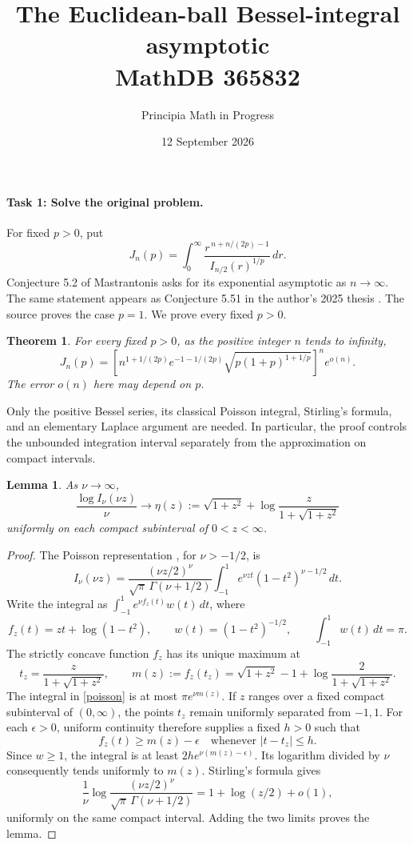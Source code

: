 \documentclass[11pt]{article}
\title{The Euclidean-ball Bessel-integral asymptotic\\MathDB 365832}
\author{Principia Math in Progress}
\date{12 September 2026}
\newtheorem{theorem}{Theorem}
\newtheorem{lemma}{Lemma}
\begin{document}
\maketitle

\paragraph{Task 1: Solve the original problem.}
For fixed \(p>0\), put
\[
 J_n(p)=\int_0^\infty
 \frac{r^{\,n+n/(2p)-1}}{I_{n/2}(r)^{1/p}}\,dr .
\]
Conjecture 5.2 of Mastrantonis \cite[p.~32]{M} asks for its
exponential asymptotic as \(n\to\infty\). The same statement appears as
Conjecture 5.51 in the author's 2025 thesis \cite[p.~214]{T}.
The source proves the case \(p=1\). We prove every fixed \(p>0\).

\begin{theorem}
For every fixed \(p>0\), as the positive integer \(n\) tends to infinity,
\[
 J_n(p)=
 \left[
 n^{1+1/(2p)}e^{-1-1/(2p)}
 \sqrt{p(1+p)^{1+1/p}}
 \right]^n e^{o(n)} .
\]
The error \(o(n)\) here may depend on \(p\).
\end{theorem}

Only the positive Bessel series, its classical Poisson integral,
Stirling's formula, and an elementary Laplace argument are needed.
In particular, the proof controls the unbounded integration interval
separately from the approximation on compact intervals.

\begin{lemma}\label{compact}
As \(\nu\to\infty\),
\[
 \frac{\log I_\nu(\nu z)}{\nu}\longrightarrow
 \eta(z):=\sqrt{1+z^2}+
 \log\frac{z}{1+\sqrt{1+z^2}}
\]
uniformly on each compact subinterval of \(0<z<\infty\).
\end{lemma}
\begin{proof}
The Poisson representation \cite[10.32.2]{DLMF}, for \(\nu>-1/2\), is
\begin{equation}\label{poisson}
 I_\nu(\nu z)=
 \frac{(\nu z/2)^\nu}{\sqrt{\pi}\,\Gamma(\nu+1/2)}
 \int_{-1}^{1}e^{\nu zt}(1-t^2)^{\nu-1/2}\,dt .
\end{equation}
Write the integral as
\(\int_{-1}^1 e^{\nu f_z(t)}w(t)\,dt\), where
\[
 f_z(t)=zt+\log(1-t^2),\qquad
 w(t)=(1-t^2)^{-1/2},\qquad \int_{-1}^1w(t)\,dt=\pi .
\]
The strictly concave function \(f_z\) has its unique maximum at
\[
 t_z=\frac{z}{1+\sqrt{1+z^2}},\qquad
 m(z):=f_z(t_z)
 =\sqrt{1+z^2}-1+\log\frac{2}{1+\sqrt{1+z^2}} .
\]
The integral in \eqref{poisson} is at most \(\pi e^{\nu m(z)}\).
If \(z\) ranges over a fixed compact subinterval of \((0,\infty)\),
the points \(t_z\) remain uniformly separated from \(-1,1\).
For each \(\epsilon>0\), uniform continuity therefore supplies a
fixed \(h>0\) such that
\[
 f_z(t)\ge m(z)-\epsilon\quad
 \text{whenever } |t-t_z|\le h .
\]
Since \(w\ge1\), the integral is at least
\(2h e^{\nu(m(z)-\epsilon)}\).
Its logarithm divided by \(\nu\) consequently tends uniformly to \(m(z)\).
Stirling's formula gives
\[
 \frac1\nu\log
 \frac{(\nu z/2)^\nu}{\sqrt{\pi}\,\Gamma(\nu+1/2)}
 =1+\log(z/2)+o(1),
\]
uniformly on the same compact interval. Adding the two limits proves
the lemma.
\end{proof}
\end{document}

